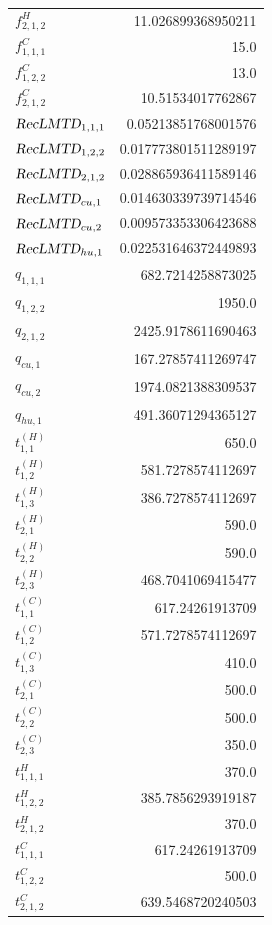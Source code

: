 \documentclass{article}%
\begin{document}
\begin{multicols*}{3}
\begin{supertabular}{lr}
	$f_{2,1,2}^{H}$ & 11.026899368950211 \\%
	$f_{1,1,1}^{C}$ & 15.0 \\%
	$f_{1,2,2}^{C}$ & 13.0 \\%
	$f_{2,1,2}^{C}$ & 10.51534017762867 \\%
	$\textsl{RecLMTD}_{1,1,1}$ & 0.05213851768001576 \\%
	$\textsl{RecLMTD}_{1,2,2}$ & 0.017773801511289197 \\%
	$\textsl{RecLMTD}_{2,1,2}$ & 0.028865936411589146 \\%
	$\textsl{RecLMTD}_{cu,1}$ & 0.014630339739714546 \\%
	$\textsl{RecLMTD}_{cu,2}$ & 0.009573353306423688 \\%
	$\textsl{RecLMTD}_{hu,1}$ & 0.022531646372449893 \\%
	$q_{1,1,1}$ & 682.7214258873025 \\%
	$q_{1,2,2}$ & 1950.0 \\%
	$q_{2,1,2}$ & 2425.9178611690463 \\%
	$q_{cu,1}$ & 167.27857411269747 \\%
	$q_{cu,2}$ & 1974.0821388309537 \\%
	$q_{hu,1}$ & 491.36071294365127 \\%
	$t_{1,1}^{(H)}$ & 650.0 \\%
	$t_{1,2}^{(H)}$ & 581.7278574112697 \\%
	$t_{1,3}^{(H)}$ & 386.7278574112697 \\%
	$t_{2,1}^{(H)}$ & 590.0 \\%
	$t_{2,2}^{(H)}$ & 590.0 \\%
	$t_{2,3}^{(H)}$ & 468.7041069415477 \\%
	$t_{1,1}^{(C)}$ & 617.24261913709 \\%
	$t_{1,2}^{(C)}$ & 571.7278574112697 \\%
	$t_{1,3}^{(C)}$ & 410.0 \\%
	$t_{2,1}^{(C)}$ & 500.0 \\%
	$t_{2,2}^{(C)}$ & 500.0 \\%
	$t_{2,3}^{(C)}$ & 350.0 \\%
	$t_{1,1,1}^{H}$ & 370.0 \\%
	$t_{1,2,2}^{H}$ & 385.7856293919187 \\%
	$t_{2,1,2}^{H}$ & 370.0 \\%
	$t_{1,1,1}^{C}$ & 617.24261913709 \\%
	$t_{1,2,2}^{C}$ & 500.0 \\%
	$t_{2,1,2}^{C}$ & 639.5468720240503 \\%

\end{supertabular}
\end{multicols*}
\end{document}
